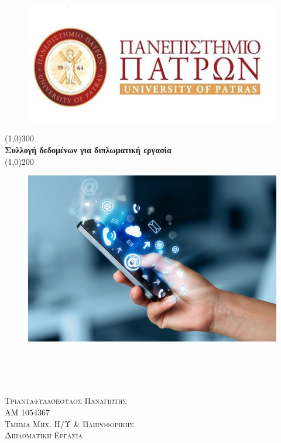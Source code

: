 \documentclass{article}
\begin{document}
\begin{titlepage}

    \begin{figure}
        \centering
        \includegraphics[scale=0.4]{Upatras}
    \end{figure}

    \begin{center}
        \line(1,0){300}\\
        [0.25in]
        \huge{\bfseries {}Συλλογή δεδομένων για διπλωματική εργασία}\\

        \line(1,0){200}\\
        \begin{figure}[H]
            \centering
            \includegraphics[scale=2.2]{logo}\\
        \end{figure}
    \end{center}

    \begin{flushright}
        \textsc{\\}
        \textsc{\\}

        \textsc{\large \\ Τριανταφυλλόπουλος Παναγιώτης\\ΑΜ 1054367}
        \textsc{\large \\ Τμήμα Μηχ. Η/Υ \& Πληροφορικής}
        \textsc{\large \\ Διπλωματική Εργασία}
    \end{flushright}

\end{titlepage}
\end{document}
